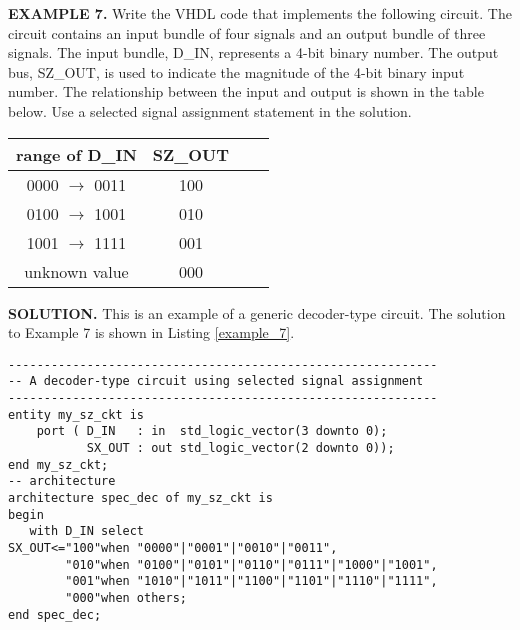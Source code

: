 \begin{leftbar}
\noindent
\textbf{EXAMPLE 7.} Write the VHDL code that implements the following circuit. The circuit contains an input bundle of four signals and an output bundle of three signals. The input bundle, D\_IN, represents a 4-bit binary number. The output bus, SZ\_OUT, is used to indicate the magnitude of the 4-bit binary input number. The relationship between the input and output is shown in the table below. Use a selected signal assignment statement in the solution.

\centering\vspace{5pt}
\begin{tabular}{c*{2}{c}r}
range of D\_IN  & SZ\_OUT \\
\hline
0000 $\rightarrow$ 0011 & 100 \\
0100 $\rightarrow$ 1001 & 010 \\
1001 $\rightarrow$ 1111 & 001 \\
unknown value		& 000 \\
\end{tabular}
\end{leftbar}
\noindent
\textbf{SOLUTION.} This is an example of a generic decoder-type circuit. The solution to Example 7 is shown in Listing \ref{example_7}.

\begin{minipage}{1\linewidth}
\centering
{}
\end{minipage}
\begin{minipage}{1\linewidth}
\begin{lstlisting}[label=example_7, caption=Solution of Example 7.]
------------------------------------------------------------
-- A decoder-type circuit using selected signal assignment
------------------------------------------------------------
entity my_sz_ckt is
    port ( D_IN   : in  std_logic_vector(3 downto 0);
           SX_OUT : out std_logic_vector(2 downto 0)); 
end my_sz_ckt;
-- architecture
architecture spec_dec of my_sz_ckt is
begin
   with D_IN select
SX_OUT<="100"when "0000"|"0001"|"0010"|"0011", 
        "010"when "0100"|"0101"|"0110"|"0111"|"1000"|"1001", 
        "001"when "1010"|"1011"|"1100"|"1101"|"1110"|"1111", 
        "000"when others;  
end spec_dec;
\end{lstlisting}
\end{minipage}

